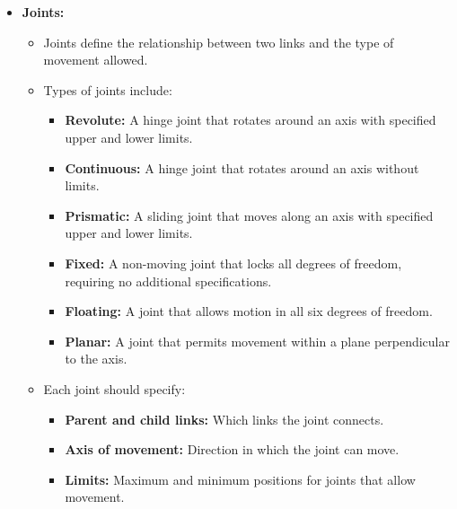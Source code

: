 {\begin{enumerate}[label=\textbf{\arabic*}.]
\begin{itemize}
\begin{itemize}
				\item Links can have properties such as:
				\begin{itemize}
					\item \textbf{Inertial properties:} Mass, center of mass, and inertia matrix.
					\item \textbf{Visual properties:} Geometry (shapes like boxes, spheres, and meshes), colors,
					and textures.
					\item \textbf{Collision properties:} Shapes used for collision detection.
				\end{itemize}
			\end{itemize}
			\item \textbf{Joints:}
			\begin{itemize}
				\item Joints define the relationship between two links and the type of movement allowed.
				\item Types of joints include:
				\begin{itemize}
					\item \textbf{Revolute:} A hinge joint that rotates around an axis with specified upper and
					lower limits.
					\item \textbf{Continuous:} A hinge joint that rotates around an axis without limits.
					\item \textbf{Prismatic:} A sliding joint that moves along an axis with specified upper and
					lower limits.
					\item \textbf{Fixed:} A non-moving joint that locks all degrees of freedom, requiring no
					additional specifications.
					\item \textbf{Floating:} A joint that allows motion in all six degrees of freedom.
					\item \textbf{Planar:} A joint that permits movement within a plane perpendicular to the axis.
				\end{itemize}
				\item Each joint should specify:
				\begin{itemize}
					\item \textbf{Parent and child links:} Which links the joint connects.
					\item \textbf{Axis of movement:} Direction in which the joint can move.
					\item \textbf{Limits:} Maximum and minimum positions for joints that allow movement.
				\end{itemize}
			\end{itemize}
		\end{itemize}


\end{enumerate}}
